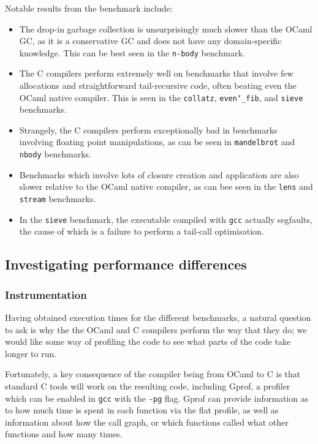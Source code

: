 \documentclass[12pt,a4paper,twoside,openright]{report}
\begin{document}
Notable results from the benchmark include:

\begin{itemize}
    \item The drop-in garbage collection is unsurprisingly much slower than the 
    OCaml GC, as it is a conservative GC and does not have any domain-specific 
    knowledge. This can be best seen in the \texttt{n-body} benchmark.
    \item The C compilers perform extremely well on benchmarks that involve few 
    allocations and straightforward tail-recursive code, often beating even the 
    OCaml native compiler. This is seen in the \texttt{collatz}, 
    \texttt{even\char`_fib}, and \texttt{sieve} benchmarks.
    \item Strangely, the C compilers perform exceptionally bad in benchmarks 
    involving floating point manipulations, as can be seen in 
    \texttt{mandelbrot} and \texttt{nbody} benchmarks.
    \item Benchmarks which involve lots of closure creation and application are 
    also slower relative to the OCaml native compiler, as can bee seen in the 
    \texttt{lens} and \texttt{stream} benchmarks.
    \item In the \texttt{sieve} benchmark, the executable compiled with 
    \texttt{gcc} actually segfaults, the cause of which is a failure to perform 
    a tail-call optimisation.
\end{itemize}

\subsection{Investigating performance differences}

\subsubsection{Instrumentation}

Having obtained execution times for the different benchmarks, a natural 
question to ask is why the the OCaml and C compilers perform the way that they 
do; we would like some way of profiling the code to see what parts of the code 
take longer to run.

Fortunately, a key consequence of the compiler being from OCaml to C is that 
standard C tools will work on the resulting code, including Gprof, a profiler 
which can be enabled in \texttt{gcc} with the \texttt{-pg} flag. Gprof can 
provide information as to how much time is spent in each function via the flat 
profile, as well as information about how the call graph, or which functions 
called what other functions and how many times.
\end{document}
